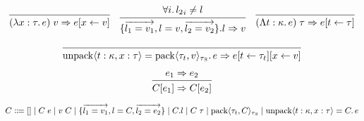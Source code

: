 \documentclass[lualatex,12pt,unicode]{article}
\begin{document}
\pagestyle{empty}

\[
    \begin{prooftree}
        \infer0{(\lambda x: \tau\ldotp e)\; v \Rightarrow e[x \leftarrow v]}
    \end{prooftree}
    \hspace{1em}
    \begin{prooftree}
        \hypo{\forall i \ldotp {l_2}_i \neq l}
        \infer1{\{\overrightarrow{l_1 = v_1}, l = v, \overrightarrow{l_2 = v_2}\}.l \Rightarrow v}
    \end{prooftree}
    \hspace{1em}
    \begin{prooftree}
        \infer0{(\Lambda t: \kappa\ldotp e)\; \tau \Rightarrow e[t \leftarrow \tau]}
    \end{prooftree}
\]

\[
    \begin{prooftree}
        \infer0{\mathrm{unpack}\langle t: \kappa, x: \tau\rangle = \mathrm{pack}\langle \tau_t, v\rangle_{\tau_\exists}\ldotp e \Rightarrow e[t \leftarrow \tau_t][x \leftarrow v]}
    \end{prooftree}
\]

\[
    \begin{prooftree}
        \hypo{e_1 \Rightarrow e_2}
        \infer1{C[e_1] \Rightarrow C[e_2]}
    \end{prooftree}
\]


\[
    C
    \Coloneqq []
    \mid C\; e
    \mid v\; C
    \mid \{\overrightarrow{l_1 = v_1}, l = C, \overrightarrow{l_2 = e_2}\}
    \mid C.l
    \mid C\; \tau
    \mid \mathrm{pack}\langle \tau_t, C\rangle_{\tau_\exists}
    \mid \mathrm{unpack}\langle t: \kappa, x: \tau\rangle = C\ldotp e
\]
\end{document}
